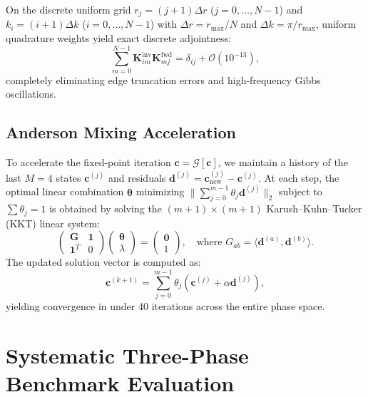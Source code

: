 \documentclass[11pt,a4paper]{article}
\begin{document}
On the discrete uniform grid $r_j = (j+1) \Delta r$ ($j = 0, \dots, N-1$) and $k_i = (i+1) \Delta k$ ($i = 0, \dots, N-1$) with $\Delta r = r_{\max}/N$ and $\Delta k = \pi / r_{\max}$, uniform quadrature weights yield exact discrete adjointness:
\begin{equation}
    \sum_{m=0}^{N-1} \mathbf{K}^{\text{inv}}_{im} \mathbf{K}^{\text{fwd}}_{mj} = \delta_{ij} + \mathcal{O}(10^{-13}),
\end{equation}
completely eliminating edge truncation errors and high-frequency Gibbs oscillations.

\subsection{Anderson Mixing Acceleration}

To accelerate the fixed-point iteration $\mathbf{c} = \mathcal{G}[\mathbf{c}]$, we maintain a history of the last $M=4$ states $\mathbf{c}^{(j)}$ and residuals $\mathbf{d}^{(j)} = \mathbf{c}_{\text{new}}^{(j)} - \mathbf{c}^{(j)}$. At each step, the optimal linear combination $\bm{\theta}$ minimizing $\|\sum_{j=0}^{m-1} \theta_j \mathbf{d}^{(j)}\|_2$ subject to $\sum \theta_j = 1$ is obtained by solving the $(m+1) \times (m+1)$ Karush--Kuhn--Tucker (KKT) linear system:
\begin{equation}
    \begin{pmatrix} 
    \mathbf{G} & \mathbf{1} \\ 
    \mathbf{1}^T & 0 
    \end{pmatrix} 
    \begin{pmatrix} 
    \bm{\theta} \\ 
    \lambda 
    \end{pmatrix} 
    = 
    \begin{pmatrix} 
    \mathbf{0} \\ 
    1 
    \end{pmatrix}, 
    \quad \text{where } G_{ab} = \langle \mathbf{d}^{(a)}, \mathbf{d}^{(b)} \rangle.
\end{equation}
The updated solution vector is computed as:
\begin{equation}
    \mathbf{c}^{(k+1)} = \sum_{j=0}^{m-1} \theta_j \left( \mathbf{c}^{(j)} + \alpha \mathbf{d}^{(j)} \right),
\end{equation}
yielding convergence in under 40 iterations across the entire phase space.

\section{Systematic Three-Phase Benchmark Evaluation}
\end{document}
